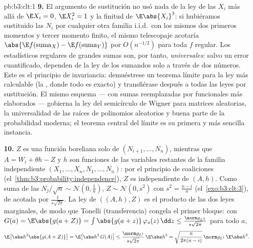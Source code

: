 \begin{solution}{pb:b3:clt:1}
\textbf{9.} El argumento de sustitución no usó nada de la ley de las
$X_i$ más allá de $\E X_i = 0$, $\E X_i^2 = 1$ y la finitud de
$\E\abs{X_i}^3$: si hubiéramos sustituido las
 $N_i$ por cualquier otra
familia i.i.d.\ con los mismos dos primeros momentos y tercer momento
finito, el mismo telescopaje acotaría
$\abs{\E f(\text{suma}_X) - \E f(\text{suma}_Y)}$ por $O(n^{-1/2})$ para
toda $f$ regular. Los estadísticos regulares de grandes sumas
 son, por tanto,
\emph{universales}: salvo un error cuantificado, dependen de la ley de
los sumandos solo a través de dos números. Este es el principio de
invariancia: demuéstrese un teorema límite para la ley más calculable
(la , donde todo es exacto)
y transfiérase después a todas las leyes por sustitución. El mismo
esquema --- con sumas reemplazadas por funcionales más elaborados ---
gobierna la ley del semicírculo de Wigner para matrices aleatorias, la
universalidad de las raíces de polinomios aleatorios y buena parte de la
probabilidad moderna; el teorema central del límite es su primera y más
sencilla instancia.

\textbf{10.} $Z$ es una función boreliana solo de $(N_{i+1}, \dots,
N_n)$, mientras que $A = W_i + \theta h - Z$ y $h$ son funciones de las
variables restantes de la familia
independiente
$(X_1, \dots, X_n, N_1, \dots, N_n)$: por el principio de coaliciones
(el~\cref{thm:b3:probability:independence}), $Z$ es
independiente de $(A, h)$.
Como suma de las
$N_j/\sqrt n \sim \mathcal N(0, \frac1n)$, $Z \sim \mathcal
N(0, s^2)$ con $s^2 = \frac{n-i}n$ (el~\cref{exo:b3:clt:3}), de
 acotada por
$\frac1{s\sqrt{2\pi}}$. La ley de $((A, h), Z)$ es el producto de las
dos leyes marginales, de modo que Tonelli (transferencia) congela el
primer bloque: con $G(a) =
\E\abs{g(a + Z)} = \int\abs{g(a + z)}\,\varphi_s(z)\,\dd z
\leq \frac{\norm g_{L^1}}{s\sqrt{2\pi}}$ para todo $a$,
\[
\E\bigl[\abs h^3\abs{g(A + Z)}\bigr] =
\E\bigl[\abs h^3\,G(A)\bigr] \leq
\frac{\norm g_{L^1}}{s\sqrt{2\pi}}\,\E\abs h^3
= \sqrt{\frac{n}{2\pi(n-i)}}\,\norm g_{L^1}\,\E\abs h^3 .
\]


\end{solution}
